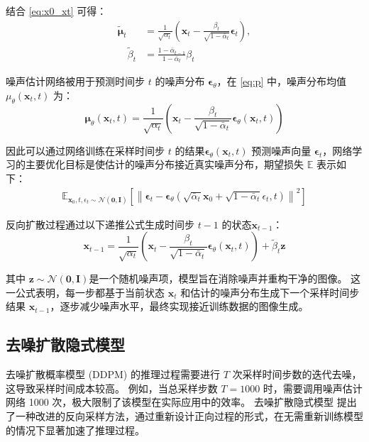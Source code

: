 结合 \eqref{eq:x0_xt} 可得：
\begin{equation}
\begin{split}
 \tilde{\boldsymbol{\mu}}_t &=\frac{1}{\sqrt{\alpha_t}}\left(\mathbf{x}_t-\frac{\beta_t}{\sqrt{1-\bar{\alpha}_t}} \boldsymbol{\epsilon}_t\right), \\
    \quad \tilde{\beta}_t &=\frac{1-\bar{\alpha}_{t-1}}{1-\bar{\alpha}_t} \beta_t
\end{split}
\end{equation}

噪声估计网络被用于预测时间步 $t$ 的噪声分布 $\boldsymbol{\epsilon}_\theta$，在 \eqref{eq:p} 中，噪声分布均值 $\mu_\theta\left(\mathbf{x}_t, t\right)$ 为：
\begin{equation}
    \boldsymbol{\mu}_\theta\left(\mathbf{x}_t, t\right)=\frac{1}{\sqrt{\alpha_t}}\left(\mathbf{x}_t-\frac{\beta_t}{\sqrt{1-\bar{\alpha}_t}} \boldsymbol{\epsilon}_\theta\left(\mathbf{x}_t, t\right)\right)
\end{equation}

因此可以通过网络训练在采样时间步 $t$ 的结果$\boldsymbol{\epsilon}_\theta\left(\mathbf{x}_t, t\right)$ 预测噪声向量 $\boldsymbol{\epsilon}_t$，网络学习的主要优化目标是使估计的噪声分布接近真实噪声分布，期望损失 $\mathbb{E}$ 表示如下：
\begin{equation}
\begin{split}
    \mathbb{E}_{\mathbf{x}_0, t, \epsilon_t \sim \mathcal{N}(\mathbf{0}, \mathbf{I})}\left[\left\|\boldsymbol{\epsilon}_t -\boldsymbol{\epsilon}_\theta\left(\sqrt{\bar{\alpha}_t} \mathbf{x}_0+\sqrt{1-\bar{\alpha}_t} \epsilon_t, t\right)\right\|^2\right]
\end{split}
\end{equation}

反向扩散过程通过以下递推公式生成时间步 $t-1$ 的状态$\mathbf{x}_{t-1}$：
\begin{equation}
    \mathbf{x}_{t-1}=\frac{1}{\sqrt{\alpha_t}}\left(\mathbf{x}_t-\frac{\beta_t}{\sqrt{1-\bar{\alpha}_t}} \boldsymbol{\epsilon}_\theta\left(\mathbf{x}_t, t\right)\right)+\tilde{\beta}_t \boldsymbol{z}
\end{equation}

其中 $\boldsymbol{z} \sim \mathcal{N}(\mathbf{0}, \mathbf{I})$是一个随机噪声项，模型旨在消除噪声并重构干净的图像。
这一公式表明，每一步都基于当前状态 $\mathbf{x}_t$ 和估计的噪声分布生成下一个采样时间步结果 $\mathbf{x}_{t-1}$，逐步减少噪声水平，最终实现接近训练数据的图像生成。

\subsection{去噪扩散隐式模型}
去噪扩散概率模型 (DDPM) 的推理过程需要进行 $T$ 次采样时间步数的迭代去噪，这导致采样时间成本较高。
例如，当总采样步数 $T=1000$ 时，需要调用噪声估计网络 1000 次，极大限制了该模型在实际应用中的效率。
去噪扩散隐式模型\cite{improved_ddpm}\cite{ddim} 提出了一种改进的反向采样方法，通过重新设计正向过程的形式，在无需重新训练模型的情况下显著加速了推理过程。

